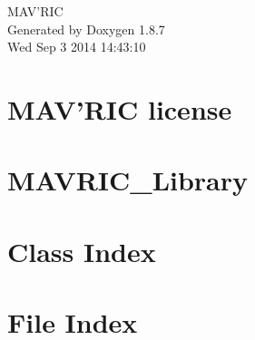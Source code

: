 \documentclass[twoside]{book}
\newcommand{\+}{\discretionary{\mbox{\scriptsize$\hookleftarrow$}}{}{}}
\newcommand{\clearemptydoublepage}{%
  \newpage{\pagestyle{empty}\cleardoublepage}%
}
\begin{document}
\hypersetup{pageanchor=false,
             bookmarks=true,
             bookmarksnumbered=true,
             pdfencoding=unicode
            }
\begin{titlepage}
\vspace*{7cm}
\begin{center}%
{\Large M\+A\+V'R\+I\+C }\\
\vspace*{1cm}
{\large Generated by Doxygen 1.8.7}\\
\vspace*{0.5cm}
{\small Wed Sep 3 2014 14:43:10}\\
\end{center}
\end{titlepage}
\clearemptydoublepage
\tableofcontents
\clearemptydoublepage
{}
\hypersetup{pageanchor=true}

\chapter{M\+A\+V'R\+I\+C license}
\label{The}
\hypertarget{The}{}

\chapter{M\+A\+V\+R\+I\+C\+\_\+\+Library}
\label{md__run_media_julien_Data_Documents_MAVRIC_MAVRIC_Library_README}
\hypertarget{md__run_media_julien_Data_Documents_MAVRIC_MAVRIC_Library_README}{}

\chapter{Class Index}

\chapter{File Index}

\end{document}

